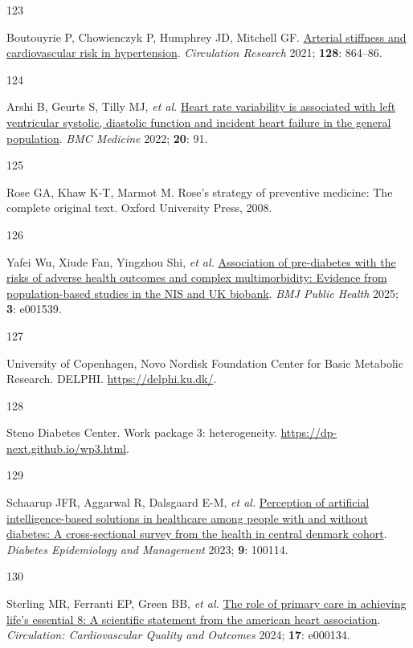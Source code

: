 \documentclass[
  letterpaper,
  headsepline=true,
  open=any]{scrbook}
\newlength{\cslhangindent}
\newlength{\csllabelwidth}
\newlength{\cslentryspacingunit} %
\newenvironment{CSLReferences}[2] %
 {%
  \setlength{\parindent}{0pt}
  \ifodd #1
  \let\oldpar\par
  \def\par{\hangindent=\cslhangindent\oldpar}
  \fi
  \setlength{\parskip}{#2\cslentryspacingunit}
 }%
 {}
\newcommand{\CSLLeftMargin}[1]{\parbox[t]{\csllabelwidth}{#1}}
\newcommand{\CSLRightInline}[1]{\parbox[t]{\linewidth - \csllabelwidth}{#1}\break}
\begin{document}
\begin{CSLReferences}{0}{0}
\leavevmode{}%
\CSLLeftMargin{123 }%
\CSLRightInline{Boutouyrie P, Chowienczyk P, Humphrey JD, Mitchell GF.
\href{https://doi.org/10.1161/CIRCRESAHA.121.318061}{Arterial stiffness
and cardiovascular risk in hypertension}. \emph{Circulation Research}
2021; \textbf{128}: 864--86.}

\leavevmode{}%
\CSLLeftMargin{124 }%
\CSLRightInline{Arshi B, Geurts S, Tilly MJ, \emph{et al.}
\href{https://doi.org/10.1186/s12916-022-02273-9}{Heart rate variability
is associated with left ventricular systolic, diastolic function and
incident heart failure in the general population}. \emph{BMC Medicine}
2022; \textbf{20}: 91.}

\leavevmode{}%
\CSLLeftMargin{125 }%
\CSLRightInline{Rose GA, Khaw K-T, Marmot M. Rose's strategy of
preventive medicine: The complete original text. Oxford University
Press, 2008.}

\leavevmode{}%
\CSLLeftMargin{126 }%
\CSLRightInline{Yafei Wu, Xiude Fan, Yingzhou Shi, \emph{et al.}
\href{https://doi.org/10.1136/bmjph-2024-001539}{Association of
pre-diabetes with the risks of adverse health outcomes and complex
multimorbidity: Evidence from population-based studies in the NIS and UK
biobank}. \emph{BMJ Public Health} 2025; \textbf{3}: e001539.}

\leavevmode{}%
\CSLLeftMargin{127 }%
\CSLRightInline{University of Copenhagen, Novo Nordisk Foundation Center
for Basic Metabolic Research. DELPHI. \url{https://delphi.ku.dk/}.}

\leavevmode{}%
\CSLLeftMargin{128 }%
\CSLRightInline{Steno Diabetes Center. Work package 3: heterogeneity.
\url{https://dp-next.github.io/wp3.html}.}

\leavevmode{}%
\CSLLeftMargin{129 }%
\CSLRightInline{Schaarup JFR, Aggarwal R, Dalsgaard E-M, \emph{et al.}
\href{https://doi.org/10.1016/j.deman.2022.100114}{Perception of
artificial intelligence-based solutions in healthcare among people with
and without diabetes: A cross-sectional survey from the health in
central denmark cohort}. \emph{Diabetes Epidemiology and Management}
2023; \textbf{9}: 100114.}

\leavevmode{}%
\CSLLeftMargin{130 }%
\CSLRightInline{Sterling MR, Ferranti EP, Green BB, \emph{et al.}
\href{https://doi.org/10.1161/HCQ.0000000000000134}{The role of primary
care in achieving life{'}s essential 8: A scientific statement from the
american heart association}. \emph{Circulation: Cardiovascular Quality
and Outcomes} 2024; \textbf{17}: e000134.}


\end{CSLReferences}
\end{document}
